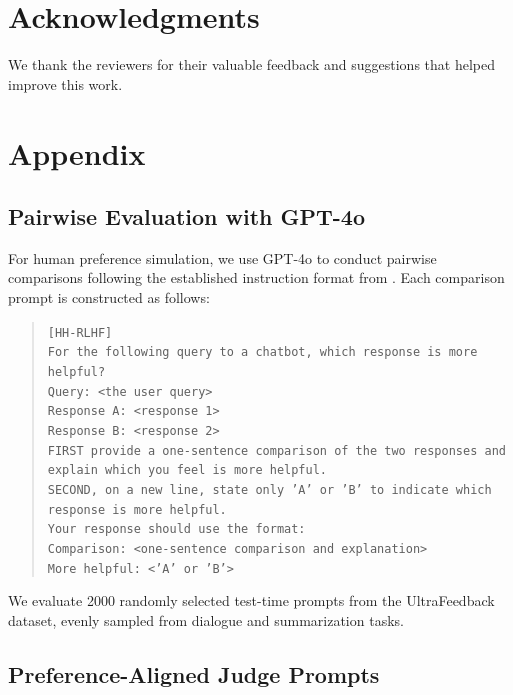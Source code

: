 \documentclass{article} %
\begin{document}
\section*{Acknowledgments}
We thank the reviewers for their valuable feedback and suggestions that helped improve this work.




\appendix
\section{Appendix}

\subsection{Pairwise Evaluation with GPT-4o}

For human preference simulation, we use GPT-4o to conduct pairwise comparisons following the established instruction format from \cite{rafailov2024direct}. Each comparison prompt is constructed as follows:

\begin{quote}
\texttt{[HH-RLHF]}\\
\texttt{For the following query to a chatbot, which response is more helpful?}\\
\texttt{Query: <the user query>}\\
\texttt{Response A: <response 1>}\\
\texttt{Response B: <response 2>}\\
\texttt{FIRST provide a one-sentence comparison of the two responses and explain which you feel is more helpful.}\\
\texttt{SECOND, on a new line, state only 'A' or 'B' to indicate which response is more helpful.}\\
\texttt{Your response should use the format:}\\
\texttt{Comparison: <one-sentence comparison and explanation>}\\
\texttt{More helpful: <'A' or 'B'>}
\end{quote}

We evaluate 2000 randomly selected test-time prompts from the UltraFeedback dataset, evenly sampled from dialogue and summarization tasks.

\subsection{Preference-Aligned Judge Prompts}
\end{document}

